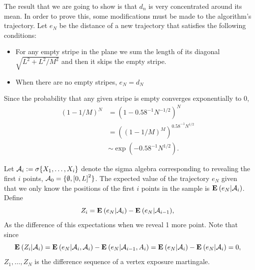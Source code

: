 The result that we are going to show is that $d_n$ is very concentrated around its mean. In order to prove this, some modifications must be made to the algorithm's trajectory. Let $e_N$ be the distance of a new trajectory that satisfies the following conditions:
\begin{itemize}
    \item For any empty stripe in the plane we sum the length of its diagonal $\sqrt{L^2+ L^2/M^2}$ and then it skips the empty stripe.
    \item When there are no empty stripes, $e_N = d_N$ 
\end{itemize}
 Since the probability that any given stripe is empty converges exponentially to 0,
\[ \begin{array}{rl}
    {(1- 1/M)}^N & = {(1- 0.58^{-1} N^{-1/2})}^N\\[1em]
    & = {\left({(1- 1/M)}^{M}\right)}^{0.58^{-1} N^{1/2}}\\[1em]
    &  \sim \exp(-0.58^{-1} N^{1/2}).
\end{array} \] 


Let $\mathcal{A}_i := \sigma\{X_1,\ldots,X_i\}$ denote the sigma algebra corresponding to revealing the first $i$ points, $\mathcal{A}_0 = \{\emptyset, {[0,L]}^2\}$. The expected value of the trajectory $e_N$ given that we only know the positions of the first $i$ points in the sample is $\mathbf{E}\: (e_N | \mathcal{A}_i)$. Define
\[ Z_i = \mathbf{E}\: (e_N | \mathcal{A}_i) - \mathbf{E}\: (e_N | \mathcal{A}_{i-1}),  \]  
As the difference of this expectations when we reveal 1 more point. Note that since
\[ \mathbf{E}\:(Z_i | \mathcal{A}_i) =  \mathbf{E}\: (e_N | \mathcal{A}_i, \mathcal{A}_i) - \mathbf{E}\: (e_N | \mathcal{A}_{i-1}, A_i) = \mathbf{E}\: (e_N | \mathcal{A}_i) - \mathbf{E}\: (e_N | \mathcal{A}_i) = 0,\] 
$Z_1, \ldots, Z_N$ is the difference sequence of a vertex exposure martingale.




